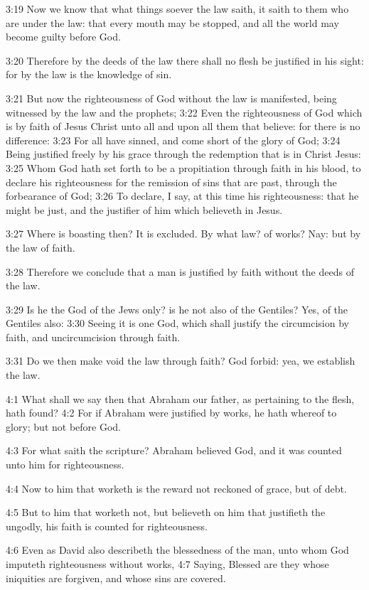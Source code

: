 3:19 Now we know that what things soever the law saith, it saith to them who are under the law: that every mouth may be stopped, and all the world may become guilty before God.

3:20 Therefore by the deeds of the law there shall no flesh be justified in his sight: for by the law is the knowledge of sin.

3:21 But now the righteousness of God without the law is manifested, being witnessed by the law and the prophets; 3:22 Even the righteousness of God which is by faith of Jesus Christ unto all and upon all them that believe: for there is no difference: 3:23 For all have sinned, and come short of the glory of God; 3:24 Being justified freely by his grace through the redemption that is in Christ Jesus: 3:25 Whom God hath set forth to be a propitiation through faith in his blood, to declare his righteousness for the remission of sins that are past, through the forbearance of God; 3:26 To declare, I say, at this time his righteousness: that he might be just, and the justifier of him which believeth in Jesus.

3:27 Where is boasting then? It is excluded. By what law? of works?  Nay: but by the law of faith.

3:28 Therefore we conclude that a man is justified by faith without the deeds of the law.

3:29 Is he the God of the Jews only? is he not also of the Gentiles?  Yes, of the Gentiles also: 3:30 Seeing it is one God, which shall justify the circumcision by faith, and uncircumcision through faith.

3:31 Do we then make void the law through faith? God forbid: yea, we establish the law.

4:1 What shall we say then that Abraham our father, as pertaining to the flesh, hath found?  4:2 For if Abraham were justified by works, he hath whereof to glory; but not before God.

4:3 For what saith the scripture? Abraham believed God, and it was counted unto him for righteousness.

4:4 Now to him that worketh is the reward not reckoned of grace, but of debt.

4:5 But to him that worketh not, but believeth on him that justifieth the ungodly, his faith is counted for righteousness.

4:6 Even as David also describeth the blessedness of the man, unto whom God imputeth righteousness without works, 4:7 Saying, Blessed are they whose iniquities are forgiven, and whose sins are covered.

